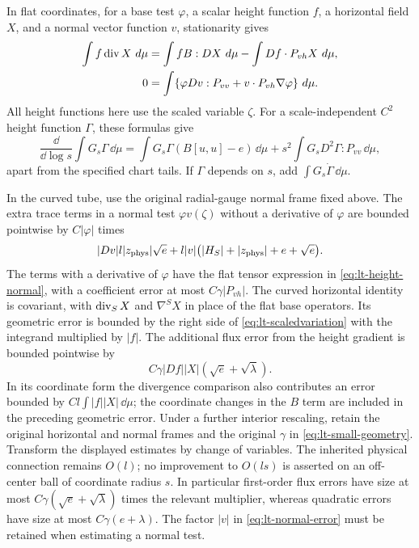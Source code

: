 \begin{lemma}\label{lt:heighttests}
In flat coordinates, for a base test $\varphi$, a scalar height function
$f$, a horizontal field $X$, and a normal vector function $v$, stationarity
gives
\begin{align}
 \int f\operatorname{div} X\,\mathop{}\!d\mu
 &=\int f B:DX\,\mathop{}\!d\mu-
                   \int Df\cdot P_{vh}X\,\mathop{}\!d\mu,
                     \label{eq:lt-height-horizontal}\\
 0&=\int\{\varphi Dv:P_{vv}
                +v\cdot P_{vh}\nabla\varphi\}\,\mathop{}\!d\mu.
                     \label{eq:lt-height-normal}
\end{align}
All height functions here use the scaled variable $\zeta$.
For a scale-independent $C^2$ height function $\Gamma$, these formulas give
\begin{equation}\label{eq:lt-height-gaussian}
 \frac{\dd}{\dd\log s}\int G_s\Gamma\,\dd\mu
 =\int G_s\Gamma(B[u,u]-e)\,\dd\mu
                       +s^2\int G_sD^2\Gamma:P_{vv}\,\dd\mu,
\end{equation}
apart from the specified chart tails.  If $\Gamma$ depends on $s$, add
$\int G_s\dot\Gamma\,\dd\mu$.

In the curved tube, use the original radial-gauge normal frame fixed above.
The extra trace terms in a normal test
$\varphi v(\zeta)$ without a derivative of $\varphi$ are bounded pointwise
by $C|\varphi|$ times
\begin{equation}\label{eq:lt-normal-error}
 |Dv|l|z_{\rm phys}|\sqrt e
       +l|v|\bigl(|H_S|+|z_{\rm phys}|+e+\sqrt e\bigr).
\end{equation}
The terms with a derivative of $\varphi$ have the flat tensor expression
in \eqref{eq:lt-height-normal}, with a coefficient error at most
$C\gamma|P_{vh}|$.
The curved horizontal identity is covariant, with $\operatorname{div}_SX$ and
$\nabla^SX$ in place of the flat base operators.  Its geometric error is
bounded by the right side of \eqref{eq:lt-scaledvariation} with the integrand
multiplied by $|f|$.  The additional flux error from the height gradient is
bounded pointwise by
\begin{equation}\label{eq:lt-horizontal-height-error}
 C\gamma |Df||X|(\sqrt e+\sqrt\lambda).
\end{equation}
In its coordinate form the divergence comparison also contributes an error
bounded by $Cl\int|f||X|\,\dd\mu$; the coordinate changes in the $B$ term
are included in the preceding geometric error.
Under a further interior rescaling, retain the original horizontal and
normal frames and the original $\gamma$ in \eqref{eq:lt-small-geometry}.
Transform the displayed estimates by change of variables.  The inherited physical
connection remains $O(l)$; no improvement to $O(ls)$ is asserted on an
off-center ball of coordinate radius $s$.  In particular
first-order flux errors have size at most
$C\gamma(\sqrt e+\sqrt\lambda)$ times the relevant multiplier, whereas
quadratic errors have size at most $C\gamma(e+\lambda)$.  The factor
$|v|$ in \eqref{eq:lt-normal-error} must be retained when estimating a
normal test.
\end{lemma}


